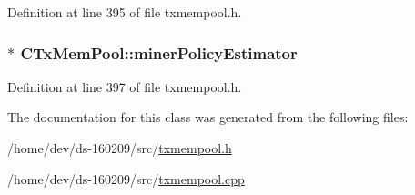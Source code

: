 Definition at line 395 of file txmempool.\+h.

\hypertarget{class_c_tx_mem_pool_a435be1fdb4567cd7dd981a49cf633c99}{}
\subsubsection[{miner\+Policy\+Estimator}]{$\ast$ C\+Tx\+Mem\+Pool\+::miner\+Policy\+Estimator}\label{class_c_tx_mem_pool_a435be1fdb4567cd7dd981a49cf633c99}


Definition at line 397 of file txmempool.\+h.



The documentation for this class was generated from the following files\+:\begin{DoxyCompactItemize}
\item 
/home/dev/ds-\/160209/src/\hyperlink{txmempool_8h}{txmempool.\+h}\item 
/home/dev/ds-\/160209/src/\hyperlink{txmempool_8cpp}{txmempool.\+cpp}\end{DoxyCompactItemize}
